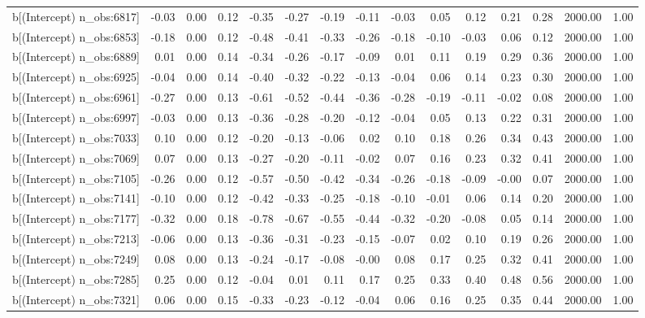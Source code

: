 \begin{table}[ht]
\begin{tabular}{rrrrrrrrrrrrrrr}
  b[(Intercept) n\_obs:6817] & -0.03 & 0.00 & 0.12 & -0.35 & -0.27 & -0.19 & -0.11 & -0.03 & 0.05 & 0.12 & 0.21 & 0.28 & 2000.00 & 1.00 \\ 
  b[(Intercept) n\_obs:6853] & -0.18 & 0.00 & 0.12 & -0.48 & -0.41 & -0.33 & -0.26 & -0.18 & -0.10 & -0.03 & 0.06 & 0.12 & 2000.00 & 1.00 \\ 
  b[(Intercept) n\_obs:6889] & 0.01 & 0.00 & 0.14 & -0.34 & -0.26 & -0.17 & -0.09 & 0.01 & 0.11 & 0.19 & 0.29 & 0.36 & 2000.00 & 1.00 \\ 
  b[(Intercept) n\_obs:6925] & -0.04 & 0.00 & 0.14 & -0.40 & -0.32 & -0.22 & -0.13 & -0.04 & 0.06 & 0.14 & 0.23 & 0.30 & 2000.00 & 1.00 \\ 
  b[(Intercept) n\_obs:6961] & -0.27 & 0.00 & 0.13 & -0.61 & -0.52 & -0.44 & -0.36 & -0.28 & -0.19 & -0.11 & -0.02 & 0.08 & 2000.00 & 1.00 \\ 
  b[(Intercept) n\_obs:6997] & -0.03 & 0.00 & 0.13 & -0.36 & -0.28 & -0.20 & -0.12 & -0.04 & 0.05 & 0.13 & 0.22 & 0.31 & 2000.00 & 1.00 \\ 
  b[(Intercept) n\_obs:7033] & 0.10 & 0.00 & 0.12 & -0.20 & -0.13 & -0.06 & 0.02 & 0.10 & 0.18 & 0.26 & 0.34 & 0.43 & 2000.00 & 1.00 \\ 
  b[(Intercept) n\_obs:7069] & 0.07 & 0.00 & 0.13 & -0.27 & -0.20 & -0.11 & -0.02 & 0.07 & 0.16 & 0.23 & 0.32 & 0.41 & 2000.00 & 1.00 \\ 
  b[(Intercept) n\_obs:7105] & -0.26 & 0.00 & 0.12 & -0.57 & -0.50 & -0.42 & -0.34 & -0.26 & -0.18 & -0.09 & -0.00 & 0.07 & 2000.00 & 1.00 \\ 
  b[(Intercept) n\_obs:7141] & -0.10 & 0.00 & 0.12 & -0.42 & -0.33 & -0.25 & -0.18 & -0.10 & -0.01 & 0.06 & 0.14 & 0.20 & 2000.00 & 1.00 \\ 
  b[(Intercept) n\_obs:7177] & -0.32 & 0.00 & 0.18 & -0.78 & -0.67 & -0.55 & -0.44 & -0.32 & -0.20 & -0.08 & 0.05 & 0.14 & 2000.00 & 1.00 \\ 
  b[(Intercept) n\_obs:7213] & -0.06 & 0.00 & 0.13 & -0.36 & -0.31 & -0.23 & -0.15 & -0.07 & 0.02 & 0.10 & 0.19 & 0.26 & 2000.00 & 1.00 \\ 
  b[(Intercept) n\_obs:7249] & 0.08 & 0.00 & 0.13 & -0.24 & -0.17 & -0.08 & -0.00 & 0.08 & 0.17 & 0.25 & 0.32 & 0.41 & 2000.00 & 1.00 \\ 
  b[(Intercept) n\_obs:7285] & 0.25 & 0.00 & 0.12 & -0.04 & 0.01 & 0.11 & 0.17 & 0.25 & 0.33 & 0.40 & 0.48 & 0.56 & 2000.00 & 1.00 \\ 
  b[(Intercept) n\_obs:7321] & 0.06 & 0.00 & 0.15 & -0.33 & -0.23 & -0.12 & -0.04 & 0.06 & 0.16 & 0.25 & 0.35 & 0.44 & 2000.00 & 1.00 \\ 

\end{tabular}
\end{table}
